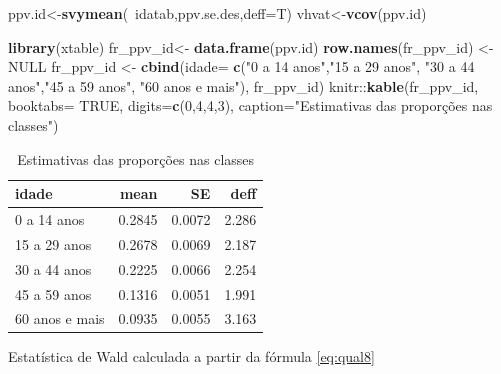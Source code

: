 \documentclass[]{book}
\newenvironment{Shaded}{\begin{snugshade}}{\end{snugshade}}
\newcommand{\KeywordTok}[1]{\textcolor[rgb]{0.13,0.29,0.53}{\textbf{{#1}}}}
\newcommand{\DataTypeTok}[1]{\textcolor[rgb]{0.13,0.29,0.53}{{#1}}}
\newcommand{\DecValTok}[1]{\textcolor[rgb]{0.00,0.00,0.81}{{#1}}}
\newcommand{\StringTok}[1]{\textcolor[rgb]{0.31,0.60,0.02}{{#1}}}
\newcommand{\OtherTok}[1]{\textcolor[rgb]{0.56,0.35,0.01}{{#1}}}
\newcommand{\NormalTok}[1]{{#1}}
\numberwithin{example}{chapter}
\numberwithin{remark}{chapter}
\numberwithin{definition}{chapter}
\begin{document}
\begin{Shaded}
\begin{Highlighting}[]
\NormalTok{ppv.id<-}\KeywordTok{svymean}\NormalTok{(~idatab,ppv.se.des,}\DataTypeTok{deff=}\NormalTok{T)}
\NormalTok{vhvat<-}\KeywordTok{vcov}\NormalTok{(ppv.id)}
\end{Highlighting}
\end{Shaded}

\begin{Shaded}
\begin{Highlighting}[]
\KeywordTok{library}\NormalTok{(xtable)}
\NormalTok{fr_ppv_id<-}\StringTok{ }\KeywordTok{data.frame}\NormalTok{(ppv.id)}
\KeywordTok{row.names}\NormalTok{(fr_ppv_id) <-}\StringTok{ }\OtherTok{NULL}
\NormalTok{fr_ppv_id <-}\StringTok{ }\KeywordTok{cbind}\NormalTok{(}\DataTypeTok{idade=} \KeywordTok{c}\NormalTok{(}\StringTok{"0 a 14 anos"}\NormalTok{,}\StringTok{"15 a 29 anos"}\NormalTok{, }\StringTok{"30 a 44 anos"}\NormalTok{,}\StringTok{"45 a 59 anos"}\NormalTok{, }\StringTok{"60 anos e mais"}\NormalTok{), fr_ppv_id)}
\NormalTok{knitr::}\KeywordTok{kable}\NormalTok{(fr_ppv_id, }\DataTypeTok{booktabs=} \OtherTok{TRUE}\NormalTok{, }\DataTypeTok{digits=}\KeywordTok{c}\NormalTok{(}\DecValTok{0}\NormalTok{,}\DecValTok{4}\NormalTok{,}\DecValTok{4}\NormalTok{,}\DecValTok{3}\NormalTok{), }\DataTypeTok{caption=}\StringTok{"Estimativas das proporções nas classes"}\NormalTok{) }
\end{Highlighting}
\end{Shaded}

\begin{table}

\caption{\label{tab:estpropclas}Estimativas das proporções nas classes}
\centering
\begin{tabular}[t]{lrrr}
\toprule
idade & mean & SE & deff\\
\midrule
0 a 14 anos & 0.2845 & 0.0072 & 2.286\\
15 a 29 anos & 0.2678 & 0.0069 & 2.187\\
30 a 44 anos & 0.2225 & 0.0066 & 2.254\\
45 a 59 anos & 0.1316 & 0.0051 & 1.991\\
60 anos e mais & 0.0935 & 0.0055 & 3.163\\
\bottomrule
\end{tabular}
\end{table}

Estatística de Wald calculada a partir da fórmula \eqref{eq:qual8}
\end{document}
